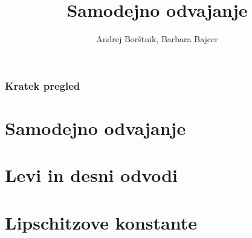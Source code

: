 \documentclass[9pt,table]{beamer}
\begin{document}

\title{Samodejno odvajanje}
\author{Andrej Borštnik, Barbara Bajcer}

\begin{frame}
   \titlepage
\end{frame}


\begin{frame}
   \frametitle{Kratek pregled}
   \tableofcontents[pausesections]
\end{frame}


\section{Samodejno odvajanje}

\begin{frame}
\frametitle{}

\end{frame}


\section{Levi in desni odvodi}

\begin{frame}
\frametitle{}

\end{frame}


\section{Lipschitzove konstante}

\begin{frame}
\frametitle{}

\end{frame}
\end{document}
